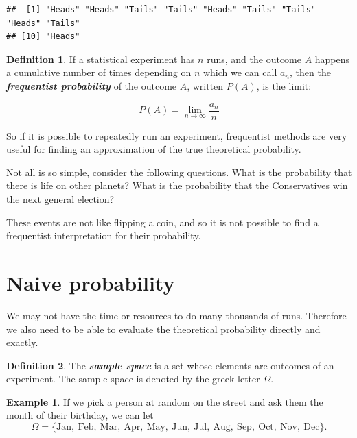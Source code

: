 \documentclass[
]{book}
\theoremstyle{definition}
\newtheorem{definition}{Definition}[chapter]
\theoremstyle{definition}
\newtheorem{example}{Example}[chapter]
\theoremstyle{definition}
\theoremstyle{definition}
\theoremstyle{remark}
\begin{document}
\begin{verbatim}
##  [1] "Heads" "Heads" "Tails" "Tails" "Heads" "Tails" "Tails" "Heads" "Tails"
## [10] "Heads"
\end{verbatim}

\begin{definition}
\protect\hypertarget{def:freq}{}\label{def:freq}If a statistical experiment has \(n\) runs, and the outcome \(A\) happens a cumulative number of times depending on \(n\) which we can call \(a_n\), then the \textbf{\emph{frequentist probability}} of the outcome \(A\), written \(P(A)\), is the limit:

\[P(A) = \lim_{n\to \infty} \frac{a_n}{n}\]
\end{definition}

So if it is possible to repeatedly run an experiment, frequentist methods are very useful for finding an approximation of the true theoretical probability.

Not all is so simple, consider the following questions. What is the probability that there is life on other planets? What is the probability that the Conservatives win the next general election?

These events are not like flipping a coin, and so it is not possible to find a frequentist interpretation for their probability.

\hypertarget{naive-probability}{%
\section{Naive probability}\label{naive-probability}}

We may not have the time or resources to do many thousands of runs. Therefore we also need to be able to evaluate the theoretical probability directly and exactly.

\begin{definition}
\protect\hypertarget{def:samplespace}{}\label{def:samplespace}The \textbf{\emph{sample space}} is a set whose elements are outcomes of an experiment. The sample space is denoted by the greek letter \(\Omega\).
\end{definition}

\begin{example}
\protect\hypertarget{exm:monthspace}{}\label{exm:monthspace}If we pick a person at random on the street and ask them the month of their birthday,
we can let
\[\Omega = \{\text{Jan}, \ \text{Feb}, \ \text{Mar},  \ \text{Apr}, \ \text{May}, \ \text{Jun}, \ \text{Jul}, \ \text{Aug}, \ \text{Sep}, \ \text{Oct}, \ \text{Nov}, \ \text{Dec} \}.\]
\end{example}
\end{document}

